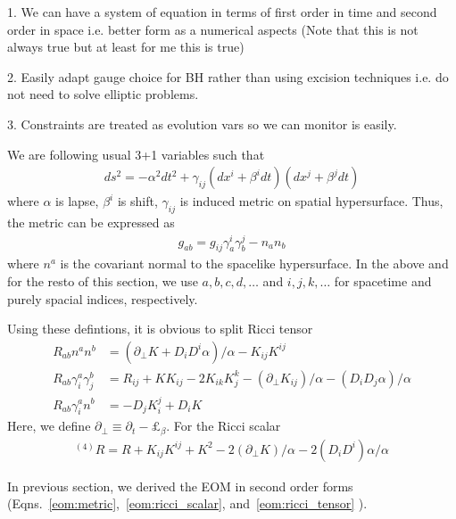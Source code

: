 \documentclass[a4paper,oneside,openany,11pt]{memoir}
\numberwithin{equation}{section} %
\newcommand{\aaron}[1]{{\color{cyan} #1}}
\begin{document}
1. We can have a system of equation in terms of first order in time and second order in space i.e. better form
as a numerical aspects (Note that this is not always true but at least for me this is true)

2. Easily adapt gauge choice for BH rather than using excision techniques i.e. do not need to solve elliptic problems.

3. Constraints are treated as evolution vars so we can monitor is easily.

We are following usual 3+1 variables such that
\begin{align}
\label{eqn:3p1}
ds^2 = -\alpha^2 dt^2 + \gamma_{ij} (dx^i + \beta^i dt)(dx^j + \beta^j dt)
\end{align}
where $\alpha$ is lapse, $\beta^i$ is shift, $\gamma_{ij}$ is induced metric on spatial hypersurface.
Thus, the metric can be expressed as
\begin{align}
g_{ab} = g_{ij}\gamma^i_a \gamma^j_b - n_a n_b
\end{align}
where $n^a$ is the covariant normal to the spacelike hypersurface. \aaron{In the above and for the resto of this section, we use $a,b,c,d,\dots$ and $i,j,k,\dots$ for spacetime and purely spacial indices, respectively.}

Using these defintions, it is obvious to split Ricci tensor
\begin{align}
\label{ricci3p1}
R_{ab} n^a n^b &= (\partial_\bot K + D_i D^i \alpha)/\alpha - K_{ij} K^{ij} \\
R_{ab} \gamma^a_i \gamma^b_j &= R_{ij} + K K_{ij} - 2 K_{ik} K^{k}_j - (\partial_\bot K_{ij})/\alpha
-(D_i D_j \alpha)/\alpha \\
R_{ab} \gamma^a_i n^b &= - D_j K^j_i + D_i K
\end{align}
Here, we define $\partial_\bot \equiv \partial_t - \pounds_\beta$. For the Ricci scalar
\begin{align}
^{(4)}R = R + K_{ij} K^{ij} + K^2 - 2 (\partial_\bot K) /\alpha - 2 (D_i D^i) \alpha / \alpha
\end{align}

In previous section, we derived the EOM in second order forms 
(Eqns.~\ref{eom:metric},~\ref{eom:ricci_scalar}, and~\ref{eom:ricci_tensor} ).
\end{document}
